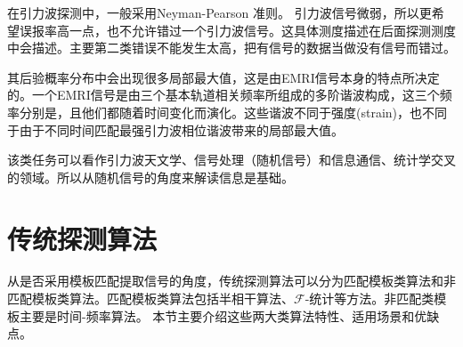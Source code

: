 


在引力波探测中，一般采用Neyman-Pearson 准则。
引力波信号微弱，所以更希望误报率高一点，也不允许错过一个引力波信号。这具体测度描述在后面探测测度中会描述。主要第二类错误不能发生太高，把有信号的数据当做没有信号而错过。

其后验概率分布中会出现很多局部最大值，这是由EMRI信号本身的特点所决定的。一个EMRI信号是由三个基本轨道相关频率所组成的多阶谐波构成，这三个频率分别是，且他们都随着时间变化而演化。这些谐波不同于强度(strain)，也不同于由于不同时间匹配最强引力波相位谐波带来的局部最大值。


该类任务可以看作引力波天文学、信号处理（随机信号）和信息通信、统计学交叉的领域。所以从随机信号的角度来解读信息是基础。
\begin{comment}
在信息论和统计学中，信息熵简称为熵，是表示随机变量的不确定性的度量。信息熵是对信息的量化度量，它对于通信、数据压缩等等都有很强的指导意义。

假设数据D是一离散型随机变量，其概率分布为：
$$P(D=d_k)=p_k,\  k=1,2,3,...,n$$
则随机变量的信息熵定义为：
$$H(D)=-\sum^n_{i=1} p_i \ \times  \ log p_i,\ i =1,2,3,...,n$$
$log p_i$ 是以2为底的对数。
\end{comment}

\section{传统探测算法}
从是否采用模板匹配提取信号的角度，传统探测算法可以分为匹配模板类算法和非匹配模板类算法。匹配模板类算法包括半相干算法、$\mathcal{F}$-统计等方法。非匹配类模板主要是时间-频率算法。 本节主要介绍这些两大类算法特性、适用场景和优缺点。


